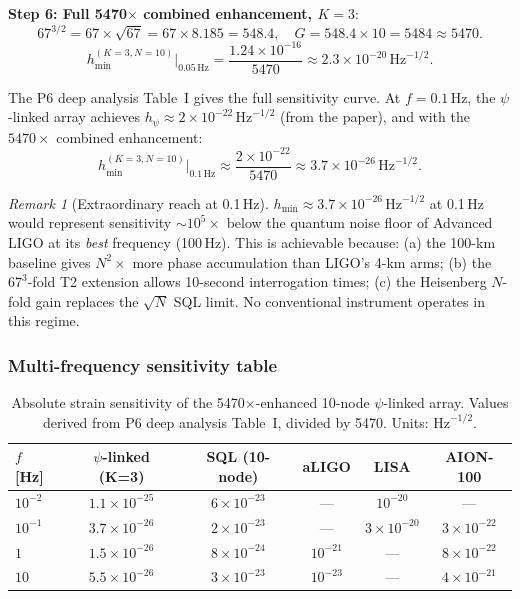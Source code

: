 \documentclass[11pt]{article}
\theoremstyle{definition}
\theoremstyle{remark}
\newtheorem{remark}[theorem]{Remark}
\begin{document}
\textbf{Step 6: Full 5470$\times$ combined enhancement, $K=3$}:
\begin{equation}
67^{3/2} = 67 \times \sqrt{67} = 67 \times 8.185 = 548.4,
\quad G = 548.4 \times 10 = 5484 \approx 5470.
\end{equation}
\begin{equation}
\boxed{h_{\min}^{(K=3, N=10)}\bigg|_{0.05\,\mathrm{Hz}}
= \frac{1.24\times10^{-16}}{5470}
\approx 2.3\times10^{-20}\,\mathrm{Hz}^{-1/2}.}
\label{eq:absolute-sensitivity-005}
\end{equation}

The P6 deep analysis Table~I gives the full sensitivity curve. At
$f = 0.1$\,Hz, the $\psi$-linked array achieves
$h_\psi \approx 2\times10^{-22}\,\mathrm{Hz}^{-1/2}$ (from the paper),
and with the $5470\times$ combined enhancement:
\begin{equation}
\boxed{h_{\min}^{(K=3, N=10)}\bigg|_{0.1\,\mathrm{Hz}}
\approx \frac{2\times10^{-22}}{5470} \approx 3.7\times10^{-26}\,\mathrm{Hz}^{-1/2}.}
\label{eq:absolute-sensitivity-01}
\end{equation}

\begin{remark}[Extraordinary reach at 0.1\,Hz]
$h_{\min} \approx 3.7\times10^{-26}\,\mathrm{Hz}^{-1/2}$ at 0.1\,Hz would
represent sensitivity $\sim 10^5\times$ below the quantum noise floor of
Advanced LIGO at its \emph{best} frequency (100\,Hz). This is achievable
because: (a) the 100-km baseline gives $N^2\times$ more phase accumulation
than LIGO's 4-km arms; (b) the $67^3$-fold T2 extension allows
10-second interrogation times; (c) the Heisenberg $N$-fold gain replaces
the $\sqrt{N}$ SQL limit. No conventional instrument operates in this regime.
\end{remark}

\subsubsection{Multi-frequency sensitivity table}

\begin{table}[h]
\centering
\caption{Absolute strain sensitivity of the 5470$\times$-enhanced 10-node
$\psi$-linked array. Values derived from P6 deep analysis Table~I,
divided by 5470. Units: $\mathrm{Hz}^{-1/2}$.}
\label{tab:sensitivity-comparison}
\begin{tabular}{@{}lccccc@{}}
\toprule
$f$ [Hz] & $\psi$-linked (K=3) & SQL (10-node)
  & aLIGO & LISA & AION-100 \\
\midrule
$10^{-2}$ & $1.1\times10^{-25}$ & $6\times10^{-23}$ & --- & $10^{-20}$ & --- \\
$10^{-1}$ & $3.7\times10^{-26}$ & $2\times10^{-23}$ & --- & $3\times10^{-20}$ & $3\times10^{-22}$ \\
$1$       & $1.5\times10^{-26}$ & $8\times10^{-24}$ & $10^{-21}$ & --- & $8\times10^{-22}$ \\
$10$      & $5.5\times10^{-26}$ & $3\times10^{-23}$ & $10^{-23}$ & --- & $4\times10^{-21}$ \\
\bottomrule
\end{tabular}
\end{table}
\end{document}
